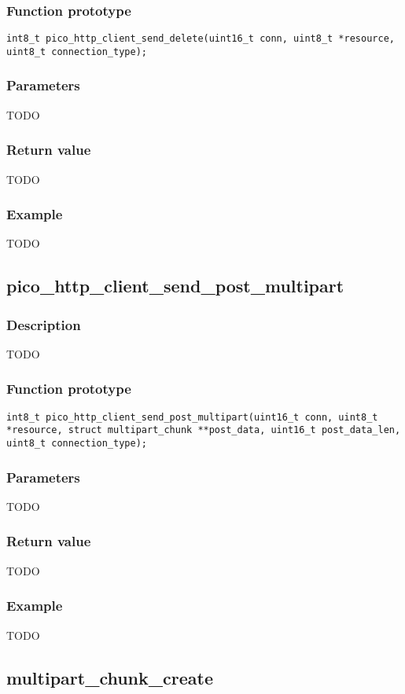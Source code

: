 \subsubsection*{Function prototype}
\texttt{int8\_t pico\_http\_client\_send\_delete(uint16\_t conn, uint8\_t *resource, uint8\_t connection\_type);}

\subsubsection*{Parameters}
TODO
\subsubsection*{Return value}
TODO
\subsubsection*{Example}
TODO


\subsection{pico\_http\_client\_send\_post\_multipart}

\subsubsection*{Description}
TODO

\subsubsection*{Function prototype}
\texttt{int8\_t pico\_http\_client\_send\_post\_multipart(uint16\_t conn, uint8\_t *resource, struct multipart\_chunk **post\_data, uint16\_t post\_data\_len, uint8\_t connection\_type);}

\subsubsection*{Parameters}
TODO
\subsubsection*{Return value}
TODO
\subsubsection*{Example}
TODO


\subsection{multipart\_chunk\_create}

